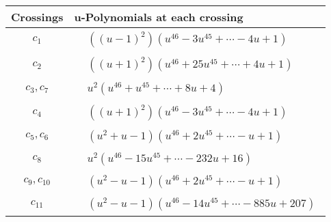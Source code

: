 \documentclass[1p]{elsarticle_modified}
\theoremstyle{definition}
\begin{document}
\begin{tabular}{m{50pt}|m{274pt}}
Crossings & \hspace{64pt}u-Polynomials at each crossing \\
\hline $$\begin{aligned}c_{1}\end{aligned}$$&$\begin{aligned}
&((u-1)^2)(u^{46}-3 u^{45}+\cdots-4 u+1)
\end{aligned}$\\
\hline $$\begin{aligned}c_{2}\end{aligned}$$&$\begin{aligned}
&((u+1)^2)(u^{46}+25 u^{45}+\cdots+4 u+1)
\end{aligned}$\\
\hline $$\begin{aligned}c_{3},c_{7}\end{aligned}$$&$\begin{aligned}
&u^2(u^{46}+u^{45}+\cdots+8 u+4)
\end{aligned}$\\
\hline $$\begin{aligned}c_{4}\end{aligned}$$&$\begin{aligned}
&((u+1)^2)(u^{46}-3 u^{45}+\cdots-4 u+1)
\end{aligned}$\\
\hline $$\begin{aligned}c_{5},c_{6}\end{aligned}$$&$\begin{aligned}
&(u^2+u-1)(u^{46}+2 u^{45}+\cdots- u+1)
\end{aligned}$\\
\hline $$\begin{aligned}c_{8}\end{aligned}$$&$\begin{aligned}
&u^2(u^{46}-15 u^{45}+\cdots-232 u+16)
\end{aligned}$\\
\hline $$\begin{aligned}c_{9},c_{10}\end{aligned}$$&$\begin{aligned}
&(u^2- u-1)(u^{46}+2 u^{45}+\cdots- u+1)
\end{aligned}$\\
\hline $$\begin{aligned}c_{11}\end{aligned}$$&$\begin{aligned}
&(u^2- u-1)(u^{46}-14 u^{45}+\cdots-885 u+207)
\end{aligned}$\\
\hline
\end{tabular}\newpage\renewcommand{\arraystretch}{1}
\end{document}

